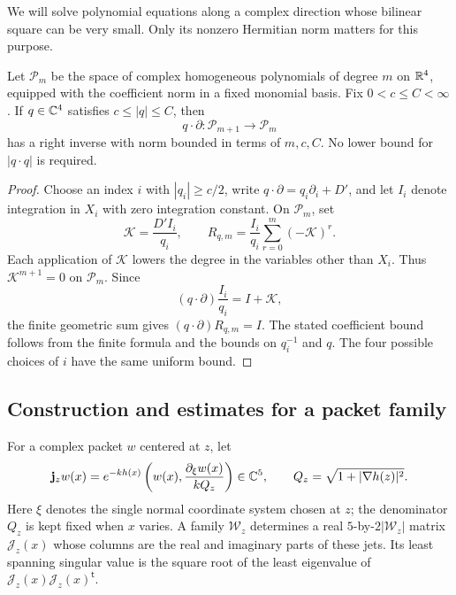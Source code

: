 We will solve polynomial equations along a complex direction whose
bilinear square can be very small. Only its nonzero Hermitian norm
matters for this purpose.

\begin{lemma}\label{lem:polynomial-inverse}
Let \(\mathcal P_m\) be the space of complex homogeneous polynomials of
degree \(m\) on \(\mathbb R^4\), equipped with the coefficient norm in a fixed
monomial basis. Fix \(0<c\le C<\infty\).
If \(q\in\mathbb C^4\) satisfies \(c\le |q|\le C\), then
\[
 q\cdot\partial:\mathcal P_{m+1}\longrightarrow\mathcal P_m
\]
has a right inverse with norm bounded in terms of \(m,c,C\).
No lower bound for \(|q\cdot q|\) is required.
\end{lemma}

\begin{proof}
Choose an index \(i\) with \(|q_i|\ge c/2\), write
\(q\cdot\partial=q_i\partial_i+D'\), and let \(I_i\) denote integration
in \(X_i\) with zero integration constant. On \(\mathcal P_m\), set
\[
 \mathcal K=\frac{D'I_i}{q_i},\qquad
 R_{q,m}=\frac{I_i}{q_i}\sum_{r=0}^{m}(-\mathcal K)^r.
\]
Each application of \(\mathcal K\) lowers the degree in the variables
other than \(X_i\). Thus \(\mathcal K^{m+1}=0\) on \(\mathcal P_m\).
Since
\[
 (q\cdot\partial)\frac{I_i}{q_i}=I+\mathcal K,
\]
the finite geometric sum gives \((q\cdot\partial)R_{q,m}=I\).
The stated coefficient bound follows from the finite formula and the
bounds on \(q_i^{-1}\) and \(q\). The four possible choices of \(i\)
have the same uniform bound.
\end{proof}

\subsection{Construction and estimates for a packet family}

For a complex packet \(w\) centered at \(z\), let
\[
 \mathbf j_z w(x)
 =e^{-kh(x)}
   \left(w(x),\frac{\partial_\xi w(x)}{kQ_z}\right)\in\mathbb C^5,\qquad
 Q_z=\sqrt{1+|\nabla h(z)|^2}.
\]
Here \(\xi\) denotes the single normal coordinate system chosen at \(z\);
the denominator \(Q_z\) is kept fixed when \(x\) varies. A family
\(\mathcal W_z\) determines a real \(5\)-by-\(2|\mathcal W_z|\) matrix
\(\mathcal J_z(x)\) whose columns are the real and imaginary parts of
these jets. Its least spanning singular value is the square root of
the least eigenvalue of
\(\mathcal J_z(x)\mathcal J_z(x)^{\mathsf t}\).

